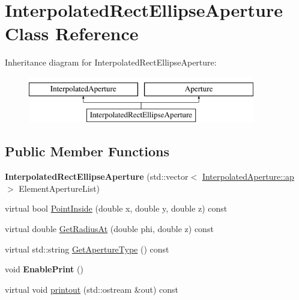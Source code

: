 \hypertarget{classInterpolatedRectEllipseAperture}{}\section{Interpolated\+Rect\+Ellipse\+Aperture Class Reference}
\label{classInterpolatedRectEllipseAperture}
Inheritance diagram for Interpolated\+Rect\+Ellipse\+Aperture\+:\begin{figure}[H]
\begin{center}
\leavevmode
\includegraphics[height=2.000000cm]{classInterpolatedRectEllipseAperture}
\end{center}
\end{figure}
\subsection*{Public Member Functions}
\begin{DoxyCompactItemize}
\item 
\mbox{\label{classInterpolatedRectEllipseAperture_a7b865b5a634ee81c9be83b8f332a595e}} 
{\bfseries Interpolated\+Rect\+Ellipse\+Aperture} (std\+::vector$<$ \hyperlink{structInterpolatedAperture_1_1ap}{Interpolated\+Aperture\+::ap} $>$ Element\+Aperture\+List)
\item 
virtual bool \hyperlink{classInterpolatedRectEllipseAperture_a53862c9efd9d7e090e08ff027b6b80cf}{Point\+Inside} (double x, double y, double z) const
\item 
virtual double \hyperlink{classInterpolatedRectEllipseAperture_aac0970213673334851109d69e0e6a423}{Get\+Radius\+At} (double phi, double z) const
\item 
virtual std\+::string \hyperlink{classInterpolatedRectEllipseAperture_a310886ba54e5ea6a4e95d8946c9a7440}{Get\+Aperture\+Type} () const
\item 
\mbox{\label{classInterpolatedRectEllipseAperture_a29c088ec134eb576d91fb3960b8a9ca2}} 
void {\bfseries Enable\+Print} ()
\item 
virtual void \hyperlink{classInterpolatedRectEllipseAperture_abd88d2108988e8653517e3291dd92ff2}{printout} (std\+::ostream \&out) const
\end{DoxyCompactItemize}
